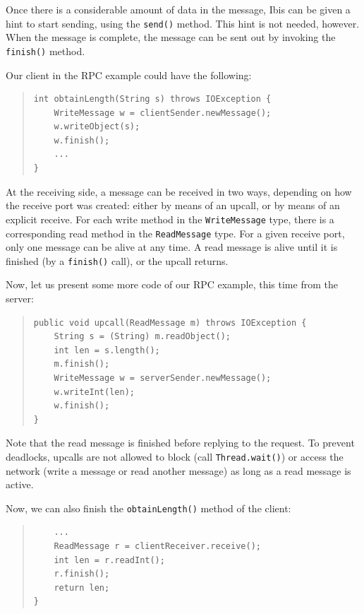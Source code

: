 \documentclass[10pt]{article}
\begin{document}
Once there is a considerable amount of data in the message, Ibis
can be given a hint to start sending, using the \texttt{send()}
method. This hint is not needed, however. When the message is
complete, the message can be sent out by invoking the
\texttt{finish()} method.

Our client in the RPC example could have the following:
{\small
\begin{quote}
\begin{verbatim}
int obtainLength(String s) throws IOException {
    WriteMessage w = clientSender.newMessage();
    w.writeObject(s);
    w.finish();
    ...
}
\end{verbatim}
\end{quote}
}

\noindent
At the receiving side, a message can be received in two ways,
depending on how the receive port was created: either by means of an
upcall, or by means of an explicit receive. For each write method
in the \texttt{WriteMessage} type, there is a corresponding read method in
the \texttt{ReadMessage} type. For a given receive port, only one message can
be alive at any time. A read message is alive until it is
finished (by a \texttt{finish()} call), or the upcall returns.

Now, let us present some more code of our RPC example, this time
from the server:

{\small
\begin{quote}
\begin{verbatim}
public void upcall(ReadMessage m) throws IOException {
    String s = (String) m.readObject();
    int len = s.length();
    m.finish();
    WriteMessage w = serverSender.newMessage();
    w.writeInt(len);
    w.finish();
}
\end{verbatim}
\end{quote}
}

\noindent
Note that the read message is finished before replying to the
request. To prevent deadlocks, upcalls are not allowed to block
(call \texttt{Thread.wait()}) or access the network (write a message or
read another message) as long as a read message is active.

Now, we can also finish the \texttt{obtainLength()} method of the client:
{\small
\begin{quote}
\begin{verbatim}
    ...
    ReadMessage r = clientReceiver.receive();
    int len = r.readInt();
    r.finish();
    return len;
}
\end{verbatim}
\end{quote}
}
\end{document}
